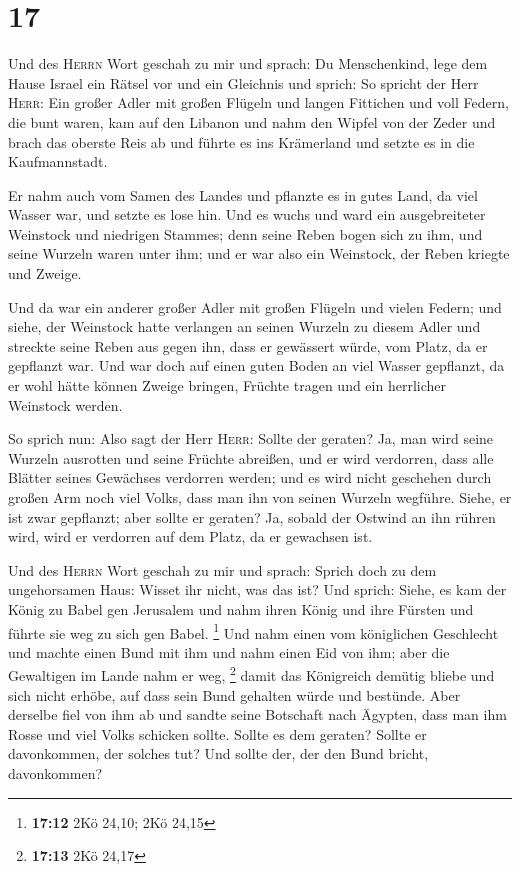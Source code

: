 \hypertarget{section-4}{%
\section{17}\label{section-4}}

 Und des \textsc{Herrn} Wort geschah zu mir und sprach:
 Du Menschenkind, lege dem Hause Israel ein Rätsel vor und
ein Gleichnis  und sprich: So spricht der Herr
\textsc{Herr}: Ein großer Adler mit großen Flügeln und langen Fittichen
und voll Federn, die bunt waren, kam auf den Libanon und nahm den Wipfel
von der Zeder  und brach das oberste Reis ab und führte es
ins Krämerland und setzte es in die Kaufmannstadt.

 Er nahm auch vom Samen des Landes und pflanzte es in
gutes Land, da viel Wasser war, und setzte es lose hin. 
Und es wuchs und ward ein ausgebreiteter Weinstock und niedrigen
Stammes; denn seine Reben bogen sich zu ihm, und seine Wurzeln waren
unter ihm; und er war also ein Weinstock, der Reben kriegte und Zweige.

 Und da war ein anderer großer Adler mit großen Flügeln
und vielen Federn; und siehe, der Weinstock hatte verlangen an seinen
Wurzeln zu diesem Adler und streckte seine Reben aus gegen ihn, dass er
gewässert würde, vom Platz, da er gepflanzt war.  Und war
doch auf einen guten Boden an viel Wasser gepflanzt, da er wohl hätte
können Zweige bringen, Früchte tragen und ein herrlicher Weinstock
werden.

 So sprich nun: Also sagt der Herr \textsc{Herr}: Sollte
der geraten? Ja, man wird seine Wurzeln ausrotten und seine Früchte
abreißen, und er wird verdorren, dass alle Blätter seines Gewächses
verdorren werden; und es wird nicht geschehen durch großen Arm noch viel
Volks, dass man ihn von seinen Wurzeln wegführe.  Siehe,
er ist zwar gepflanzt; aber sollte er geraten? Ja, sobald der Ostwind an
ihn rühren wird, wird er verdorren auf dem Platz, da er gewachsen ist.

 Und des \textsc{Herrn} Wort geschah zu mir und sprach:
 Sprich doch zu dem ungehorsamen Haus: Wisset ihr nicht,
was das ist? Und sprich: Siehe, es kam der König zu Babel gen Jerusalem
und nahm ihren König und ihre Fürsten und führte sie weg zu sich gen
Babel. \footnote{\textbf{17:12} 2Kö 24,10; 2Kö 24,15} 
Und nahm einen vom königlichen Geschlecht und machte einen Bund mit ihm
und nahm einen Eid von ihm; aber die Gewaltigen im Lande nahm er weg,
\footnote{\textbf{17:13} 2Kö 24,17}  damit das Königreich
demütig bliebe und sich nicht erhöbe, auf dass sein Bund gehalten würde
und bestünde.  Aber derselbe fiel von ihm ab und sandte
seine Botschaft nach Ägypten, dass man ihm Rosse und viel Volks schicken
sollte. Sollte es dem geraten? Sollte er davonkommen, der solches tut?
Und sollte der, der den Bund bricht, davonkommen?

